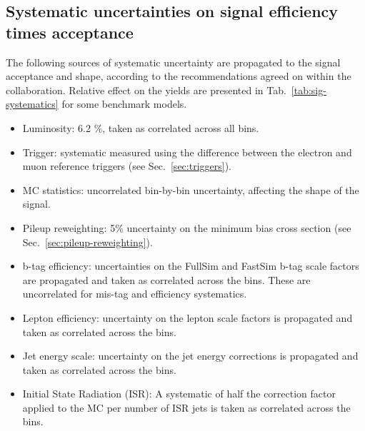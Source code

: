 

\subsection{Systematic uncertainties on signal efficiency times acceptance}
\label{sec:sig-syst}
The following sources of systematic uncertainty are propagated to the signal acceptance and shape, 
according to the recommendations agreed on within the collaboration. 
Relative effect on the yields are presented in Tab.~\ref{tab:sig-systematics} for some benchmark models. 

\begin{itemize}
  \item Luminosity: 6.2 \%, taken as correlated across all bins.
  \item Trigger: systematic measured using the difference between the electron and muon
  reference triggers (see Sec.~\ref{sec:triggers}). 
  \item MC statistics:  uncorrelated bin-by-bin uncertainty, affecting the shape of the signal. 
  \item Pileup reweighting: 5\% uncertainty on the minimum bias cross section (see Sec.~\ref{sec:pileup-reweighting}).
  \item b-tag efficiency: uncertainties on the FullSim and FastSim b-tag scale factors are propagated and taken as correlated across the bins. These are uncorrelated for mis-tag and efficiency systematics.
  \item Lepton efficiency: uncertainty on the lepton scale factors is propagated and taken as correlated across the bins. 
  \item Jet energy scale: uncertainty on the jet energy corrections is propagated and taken as correlated across the bins.
  \item Initial State Radiation (ISR): A systematic of half the correction factor applied to the MC per number of ISR jets is taken as correlated across the bins.
\end{itemize}



